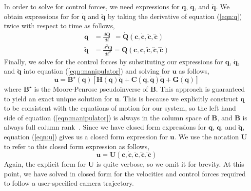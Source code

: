 
In order to solve for control forces, we need expressions for $\mathbf{q}$, $\dot{\mathbf{q}}$, and $\ddot{\mathbf{q}}$.
We obtain expressions for for $\dot{\mathbf{q}}$ and $\ddot{\mathbf{q}}$ by taking the derivative of equation (\ref{eqn:q}) twice with respect to time as follows,
%
\begin{equation}
\begin{aligned}
\dot{\mathbf{q}}  & = \frac{d \mathbf{Q}}{d t}     ~~= \mathbf{\dot{\mathbf{Q}}}(\mathbf{c},\dot{\mathbf{c}},\ddot{\mathbf{c}},\dddot{\mathbf{c}} ) \\
\ddot{\mathbf{q}} & = \frac{d^2 \mathbf{Q}}{d t^2}   = \mathbf{\ddot{\mathbf{Q}}}(\mathbf{c},\dot{\mathbf{c}},\ddot{\mathbf{c}},\dddot{\mathbf{c}},\ddddot{\mathbf{c}} )
\end{aligned}
\label{eqn:qdotN}
\end{equation}
%
Finally, we solve for the control forces by substituting our expressions for $\mathbf{q}$, $\dot{\mathbf{q}}$, and $\ddot{\mathbf{q}}$ into equation (\ref{eqn:manipulator}) and solving for $\mathbf{u}$ as follows,
%
\begin{equation}
\mathbf{u} = \mathbf{B}^{\star}(\mathbf{q}) \left[\mathbf{H}(\mathbf{q}) \ddot{\mathbf{q}} + \mathbf{C}(\mathbf{q},\dot{\mathbf{q}}) \dot{\mathbf{q}} + \mathbf{G}(\mathbf{q})\right]
\label{eqn:u}
\end{equation}
%
where $\mathbf{B}^{\star}$ is the Moore-Penrose pseudoinverse of $\mathbf{B}$.
This approach is guaranteed to yield an exact unique solution for $\mathbf{u}$.
This is because we explicitly construct $\mathbf{q}$ to be consistent with the equations of motion for our system, so the left hand side of equation (\ref{eqn:manipulator}) is always in the column space of $\mathbf{B}$, and $\mathbf{B}$ is always full column rank~\cite{joubert:2015}.
Since we have closed form expressions for $\mathbf{q}$, $\dot{\mathbf{q}}$, and $\ddot{\mathbf{q}}$, equation (\ref{eqn:u}) gives us a closed form expression for $\mathbf{u}$.
We use the notation $\mathbf{U}$ to refer to this closed form expression as follows,
%
\begin{equation}
\mathbf{u} = \mathbf{U}(\mathbf{c},\dot{\mathbf{c}},\ddot{\mathbf{c}},\dddot{\mathbf{c}},\ddddot{\mathbf{c}} )
\label{eqn:uc}
\end{equation}
%
Again, the explicit form for $\mathbf{U}$ is quite verbose, so we omit it for brevity.
At this point, we have solved in closed form for the velocities and control forces required to follow a user-specified camera trajectory.



